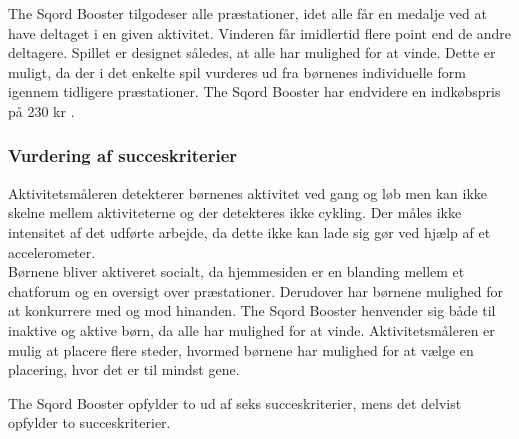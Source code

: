 The Sqord Booster tilgodeser alle præstationer, idet alle får en medalje ved at have deltaget i en given aktivitet. Vinderen får imidlertid flere point end de andre deltagere. Spillet er designet således, at alle har mulighed for at vinde. Dette er muligt, da der i det enkelte spil vurderes ud fra børnenes individuelle form igennem tidligere præstationer. \citep{Sqord_family2015} \newline
The Sqord Booster har endvidere en indkøbspris på 230 kr \citep{Sqord_family2015}. 

\subsubsection{Vurdering af succeskriterier}
Aktivitetsmåleren detekterer børnenes aktivitet ved gang og løb men kan ikke skelne mellem aktiviteterne og der detekteres ikke cykling. Der måles ikke intensitet af det udførte arbejde, da dette ikke kan lade sig gør ved hjælp af et accelerometer.\\ %
Børnene bliver aktiveret socialt, da hjemmesiden er en blanding mellem et chatforum og en oversigt over præstationer. Derudover har børnene mulighed for at konkurrere med og mod hinanden. The Sqord Booster henvender sig både til inaktive og aktive børn, da alle har mulighed for at vinde. Aktivitetsmåleren er mulig at placere flere steder, hvormed børnene har mulighed for at vælge en placering, hvor det er til mindst gene.~\citep{Sqord_family2015,Sqord_group2015}

The Sqord Booster opfylder to ud af seks succeskriterier, mens det delvist opfylder to succeskriterier.

